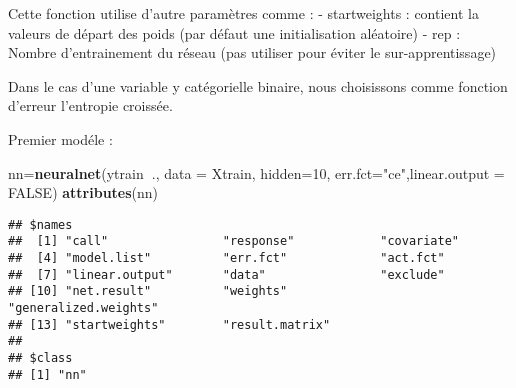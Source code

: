 \documentclass[
]{article}
\newenvironment{Shaded}{\begin{snugshade}}{\end{snugshade}}
\newcommand{\DataTypeTok}[1]{\textcolor[rgb]{0.13,0.29,0.53}{#1}}
\newcommand{\DecValTok}[1]{\textcolor[rgb]{0.00,0.00,0.81}{#1}}
\newcommand{\KeywordTok}[1]{\textcolor[rgb]{0.13,0.29,0.53}{\textbf{#1}}}
\newcommand{\NormalTok}[1]{#1}
\newcommand{\OperatorTok}[1]{\textcolor[rgb]{0.81,0.36,0.00}{\textbf{#1}}}
\newcommand{\OtherTok}[1]{\textcolor[rgb]{0.56,0.35,0.01}{#1}}
\newcommand{\StringTok}[1]{\textcolor[rgb]{0.31,0.60,0.02}{#1}}
\begin{document}
Cette fonction utilise d'autre paramètres comme : - startweights :
contient la valeurs de départ des poids (par défaut une initialisation
aléatoire) - rep : Nombre d'entrainement du réseau (pas utiliser pour
éviter le sur-apprentissage)

Dans le cas d'une variable y catégorielle binaire, nous choisissons
comme fonction d'erreur l'entropie croissée.

Premier modéle :

\begin{Shaded}
\begin{Highlighting}[]
\NormalTok{nn=}\KeywordTok{neuralnet}\NormalTok{(ytrain}\OperatorTok{~}\NormalTok{., }\DataTypeTok{data =}\NormalTok{ Xtrain, }\DataTypeTok{hidden=}\DecValTok{10}\NormalTok{, }\DataTypeTok{err.fct=}\StringTok{"ce"}\NormalTok{,}\DataTypeTok{linear.output =} \OtherTok{FALSE}\NormalTok{)}
\KeywordTok{attributes}\NormalTok{(nn)}
\end{Highlighting}
\end{Shaded}

\begin{verbatim}
## $names
##  [1] "call"                "response"            "covariate"          
##  [4] "model.list"          "err.fct"             "act.fct"            
##  [7] "linear.output"       "data"                "exclude"            
## [10] "net.result"          "weights"             "generalized.weights"
## [13] "startweights"        "result.matrix"      
## 
## $class
## [1] "nn"
\end{verbatim}

\begin{Shaded}
\end{Shaded}
\end{document}
